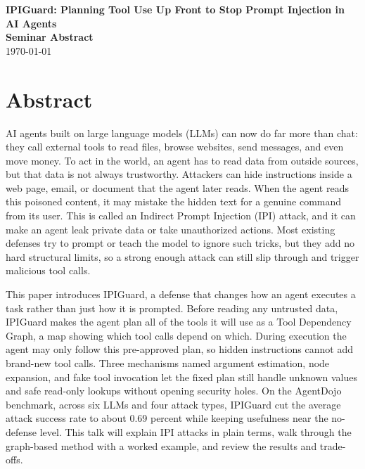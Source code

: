 \documentclass[12pt]{article}
\newcommand{\seminardate}{\today}
\begin{document}
\begin{center}
  {\LARGE\bfseries IPIGuard: Planning Tool Use Up Front to Stop Prompt Injection in AI Agents}\\[8pt]
  {\large\bfseries Seminar Abstract}\\[6pt]
  {\normalsize \seminardate}
\end{center}
\vspace{1.5em}

\section*{Abstract}
AI agents built on large language models (LLMs) can now do far more than chat: they call external tools to read files, browse websites, send messages, and even move money. To act in the world, an agent has to read data from outside sources, but that data is not always trustworthy. Attackers can hide instructions inside a web page, email, or document that the agent later reads. When the agent reads this poisoned content, it may mistake the hidden text for a genuine command from its user. This is called an Indirect Prompt Injection (IPI) attack, and it can make an agent leak private data or take unauthorized actions. Most existing defenses try to prompt or teach the model to ignore such tricks, but they add no hard structural limits, so a strong enough attack can still slip through and trigger malicious tool calls.

This paper introduces IPIGuard, a defense that changes how an agent executes a task rather than just how it is prompted. Before reading any untrusted data, IPIGuard makes the agent plan all of the tools it will use as a Tool Dependency Graph, a map showing which tool calls depend on which. During execution the agent may only follow this pre-approved plan, so hidden instructions cannot add brand-new tool calls. Three mechanisms named argument estimation, node expansion, and fake tool invocation let the fixed plan still handle unknown values and safe read-only lookups without opening security holes. On the AgentDojo benchmark, across six LLMs and four attack types, IPIGuard cut the average attack success rate to about 0.69 percent while keeping usefulness near the no-defense level. This talk will explain IPI attacks in plain terms, walk through the graph-based method with a worked example, and review the results and trade-offs.
\end{document}
